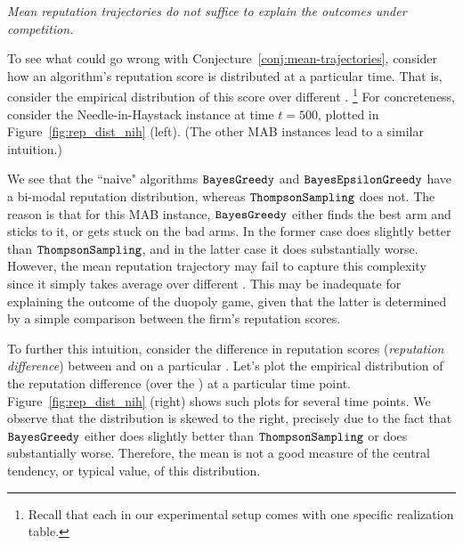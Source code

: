 \documentclass[../competing_bandits_with_appendix.tex]{subfiles}
\begin{document}
\begin{finding}
\textit{
Mean reputation trajectories do not suffice to explain the outcomes under competition.}
\end{finding}

To see what could go wrong with Conjecture~\ref{conj:mean-trajectories}, consider how an algorithm's reputation score is distributed at a particular time. That is, consider the empirical distribution of this score over different \MRVs.%
\footnote{Recall that each \MRV in our experimental setup comes with one specific realization table.} For concreteness, consider the Needle-in-Haystack instance at time $t=500$, plotted in Figure~\ref{fig:rep_dist_nih} (left). (The other MAB instances lead to a similar intuition.)

We see that the ``naive" algorithms $\mathtt{BayesGreedy}$ and $\mathtt{BayesEpsilonGreedy}$ have a bi-modal reputation distribution, whereas $\mathtt{ThompsonSampling}$ does not. The reason is that for this MAB instance, $\mathtt{BayesGreedy}$ either finds the best arm and sticks to it, or gets stuck on the bad arms. In the former case \DynamicGreedy does slightly better than $\mathtt{ThompsonSampling}$, and in the latter case it does substantially worse. However, the mean reputation trajectory may fail to capture this complexity since it simply takes average over different \MRVs. This may be inadequate for explaining the outcome of the duopoly game, given that the latter is determined by a simple comparison between the firm's reputation scores.

To further this intuition, consider the difference in reputation scores (\emph{reputation difference}) between \Thompson and \DynamicGreedy on a particular \MRV. Let's plot the empirical distribution of the reputation difference (over the \MRVs) at a particular time point. Figure~\ref{fig:rep_dist_nih} (right) shows such plots for several time points. We observe that the distribution is skewed to the right, precisely due to the fact that $\mathtt{BayesGreedy}$ either does slightly better than $\mathtt{ThompsonSampling}$ or does substantially worse. Therefore, the mean is not a good measure of the central tendency, or typical value, of this distribution.

\end{document}
